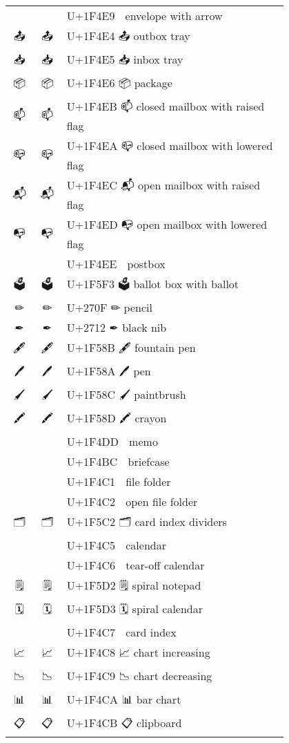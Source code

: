 \documentclass[a4paper,12pt]{article}
\newcommand{\fontA}[1]{{\fontspec[RawFeature={mode=harf,+dist,+ccmp}]{Segoe UI Emoji} #1}}
\newcommand{\fontB}[1]{{\fontspec[RawFeature={mode=harf,+dist,+ccmp}]{Noto Color Emoji} #1}}
\begin{document}
\begin{longtable}[c]{ccp{0.8\linewidth}}
\fontA{📩}&\fontB{📩}&U+1F4E9 📩 envelope with arrow\\
\fontA{📤}&\fontB{📤}&U+1F4E4 📤 outbox tray\\
\fontA{📥}&\fontB{📥}&U+1F4E5 📥 inbox tray\\
\fontA{📦}&\fontB{📦}&U+1F4E6 📦 package\\
\fontA{📫}&\fontB{📫}&U+1F4EB 📫 closed mailbox with raised flag\\
\fontA{📪}&\fontB{📪}&U+1F4EA 📪 closed mailbox with lowered flag\\
\fontA{📬}&\fontB{📬}&U+1F4EC 📬 open mailbox with raised flag\\
\fontA{📭}&\fontB{📭}&U+1F4ED 📭 open mailbox with lowered flag\\
\fontA{📮}&\fontB{📮}&U+1F4EE 📮 postbox\\
\fontA{🗳}&\fontB{🗳}&U+1F5F3 🗳 ballot box with ballot\\
\fontA{✏}&\fontB{✏}&U+270F ✏ pencil\\
\fontA{✒}&\fontB{✒}&U+2712 ✒ black nib\\
\fontA{🖋}&\fontB{🖋}&U+1F58B 🖋 fountain pen\\
\fontA{🖊}&\fontB{🖊}&U+1F58A 🖊 pen\\
\fontA{🖌}&\fontB{🖌}&U+1F58C 🖌 paintbrush\\
\fontA{🖍}&\fontB{🖍}&U+1F58D 🖍 crayon\\
\fontA{📝}&\fontB{📝}&U+1F4DD 📝 memo\\
\fontA{💼}&\fontB{💼}&U+1F4BC 💼 briefcase\\
\fontA{📁}&\fontB{📁}&U+1F4C1 📁 file folder\\
\fontA{📂}&\fontB{📂}&U+1F4C2 📂 open file folder\\
\fontA{🗂}&\fontB{🗂}&U+1F5C2 🗂 card index dividers\\
\fontA{📅}&\fontB{📅}&U+1F4C5 📅 calendar\\
\fontA{📆}&\fontB{📆}&U+1F4C6 📆 tear-off calendar\\
\fontA{🗒}&\fontB{🗒}&U+1F5D2 🗒 spiral notepad\\
\fontA{🗓}&\fontB{🗓}&U+1F5D3 🗓 spiral calendar\\
\fontA{📇}&\fontB{📇}&U+1F4C7 📇 card index\\
\fontA{📈}&\fontB{📈}&U+1F4C8 📈 chart increasing\\
\fontA{📉}&\fontB{📉}&U+1F4C9 📉 chart decreasing\\
\fontA{📊}&\fontB{📊}&U+1F4CA 📊 bar chart\\
\fontA{📋}&\fontB{📋}&U+1F4CB 📋 clipboard\\

\end{longtable}
\end{document}
